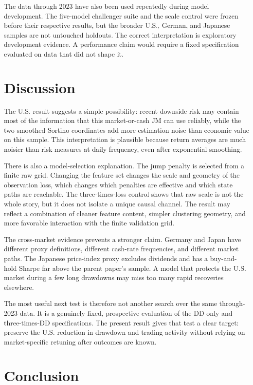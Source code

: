 \documentclass[11pt]{article}
\begin{document}
The data through 2023 have also been used repeatedly during model development. The five-model challenger suite and the scale control were frozen before their respective results, but the broader U.S., German, and Japanese samples are not untouched holdouts. The correct interpretation is exploratory development evidence. A performance claim would require a fixed specification evaluated on data that did not shape it.

\section{Discussion}

The U.S. result suggests a simple possibility: recent downside risk may contain most of the information that this market-or-cash JM can use reliably, while the two smoothed Sortino coordinates add more estimation noise than economic value on this sample. This interpretation is plausible because return averages are much noisier than risk measures at daily frequency, even after exponential smoothing.

There is also a model-selection explanation. The jump penalty is selected from a finite raw grid. Changing the feature set changes the scale and geometry of the observation loss, which changes which penalties are effective and which state paths are reachable. The three-times-loss control shows that raw scale is not the whole story, but it does not isolate a unique causal channel. The result may reflect a combination of cleaner feature content, simpler clustering geometry, and more favorable interaction with the finite validation grid.

The cross-market evidence prevents a stronger claim. Germany and Japan have different proxy definitions, different cash-rate frequencies, and different market paths. The Japanese price-index proxy excludes dividends and has a buy-and-hold Sharpe far above the parent paper's sample. A model that protects the U.S. market during a few long drawdowns may miss too many rapid recoveries elsewhere.

The most useful next test is therefore not another search over the same through-2023 data. It is a genuinely fixed, prospective evaluation of the DD-only and three-times-DD specifications. The present result gives that test a clear target: preserve the U.S. reduction in drawdown and trading activity without relying on market-specific retuning after outcomes are known.

\section{Conclusion}
\end{document}
